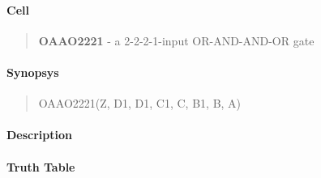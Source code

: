 \label{OAAO2221}
\paragraph{Cell}
\begin{quote}
    \textbf{OAAO2221} - a 2-2-2-1-input OR-AND-AND-OR gate
\end{quote}

\paragraph{Synopsys}
\begin{quote}
    OAAO2221(Z, D1, D1, C1, C, B1, B, A)
\end{quote}

\paragraph{Description}

%

\paragraph{Truth Table}
%

